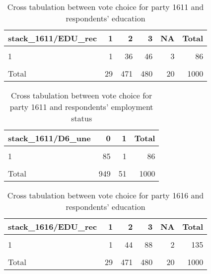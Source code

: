 \documentclass[
]{article}
\begin{document}
\begin{table}

\caption{\label{tab:unnamed-chunk-105}Cross tabulation between vote choice for party 1611 and respondents' education
                   \label{table:crosstab_1_lv}}
\centering
\begin{tabular}[t]{l|r|r|r|r|r}
\hline
stack\_1611/EDU\_rec & 1 & 2 & 3 & NA & Total\\
\hline
\cellcolor{gray!6}{0} & \cellcolor{gray!6}{26} & \cellcolor{gray!6}{422} & \cellcolor{gray!6}{422} & \cellcolor{gray!6}{17} & \cellcolor{gray!6}{887}\\
\hline
1 & 1 & 36 & 46 & 3 & 86\\
\hline
\cellcolor{gray!6}{NA} & \cellcolor{gray!6}{2} & \cellcolor{gray!6}{13} & \cellcolor{gray!6}{12} & \cellcolor{gray!6}{0} & \cellcolor{gray!6}{27}\\
\hline
Total & 29 & 471 & 480 & 20 & 1000\\
\hline
\end{tabular}
\end{table}

\begin{table}

\caption{\label{tab:unnamed-chunk-105}Cross tabulation between vote choice for party 1611 and respondents' employment status
                   \label{table:crosstab_2_lv}}
\centering
\begin{tabular}[t]{l|r|r|r}
\hline
stack\_1611/D6\_une & 0 & 1 & Total\\
\hline
\cellcolor{gray!6}{0} & \cellcolor{gray!6}{838} & \cellcolor{gray!6}{49} & \cellcolor{gray!6}{887}\\
\hline
1 & 85 & 1 & 86\\
\hline
\cellcolor{gray!6}{NA} & \cellcolor{gray!6}{26} & \cellcolor{gray!6}{1} & \cellcolor{gray!6}{27}\\
\hline
Total & 949 & 51 & 1000\\
\hline
\end{tabular}
\end{table}

\begin{table}

\caption{\label{tab:unnamed-chunk-105}Cross tabulation between vote choice for party 1616 and respondents' education 
                   \label{table:crosstab_3_lv}}
\centering
\begin{tabular}[t]{l|r|r|r|r|r}
\hline
stack\_1616/EDU\_rec & 1 & 2 & 3 & NA & Total\\
\hline
\cellcolor{gray!6}{0} & \cellcolor{gray!6}{26} & \cellcolor{gray!6}{414} & \cellcolor{gray!6}{380} & \cellcolor{gray!6}{18} & \cellcolor{gray!6}{838}\\
\hline
1 & 1 & 44 & 88 & 2 & 135\\
\hline
\cellcolor{gray!6}{NA} & \cellcolor{gray!6}{2} & \cellcolor{gray!6}{13} & \cellcolor{gray!6}{12} & \cellcolor{gray!6}{0} & \cellcolor{gray!6}{27}\\
\hline
Total & 29 & 471 & 480 & 20 & 1000\\
\hline
\end{tabular}
\end{table}
\end{document}
